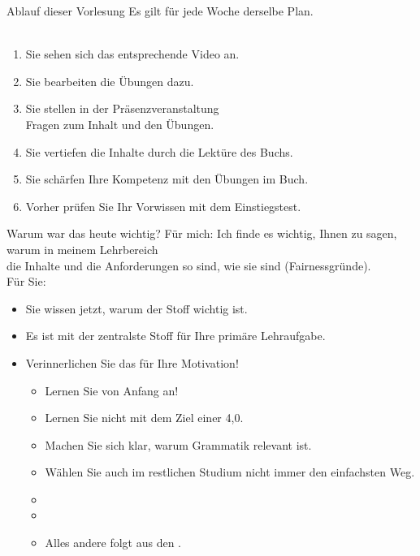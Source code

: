 \begin{frame}
  {Ablauf dieser Vorlesung}
  \onslide<+->
  \onslide<+->
  Es gilt für jede Woche derselbe Plan.\\
  \\
  \Zeile
  \begin{enumerate}[<+->]\Large
    \item Sie sehen sich das entsprechende \alert{Video} an.
    \item Sie bearbeiten die \alert{Übungen} dazu.
    \item Sie stellen in der Präsenzveranstaltung\\
      \alert{Fragen zum Inhalt und den Übungen}.
    \item Sie vertiefen die Inhalte durch die \alert{Lektüre des Buchs}.
    \item Sie schärfen Ihre Kompetenz mit den \alert{Übungen im Buch}.
      \Halbzeile
    \item[ ] Vorher prüfen Sie Ihr Vorwissen mit dem \alert{Einstiegstest}.
  \end{enumerate}
\end{frame}

\begin{frame}
  {Warum war das heute wichtig?}
  \onslide<+->
  \onslide<+->
  Für mich: Ich finde es wichtig, Ihnen zu sagen, warum in meinem Lehrbereich\\
  die Inhalte und die Anforderungen so sind, wie sie sind (\alert{Fairnessgründe}).\\
  \onslide<+->
  \Zeile
  Für Sie:\\
  \Halbzeile
  \begin{itemize}[<+->]
    \item Sie wissen jetzt, \alert{warum der Stoff wichtig ist}.
    \item Es ist mit der zentralste Stoff für Ihre primäre Lehraufgabe.
    \item \alert{Verinnerlichen Sie das für Ihre Motivation!}
      \begin{itemize}[<+->]
        \item \alert{Lernen Sie von Anfang an!}
        \item Lernen Sie nicht mit dem Ziel einer 4,0.
        \item \alert{Machen Sie sich klar, warum Grammatik relevant ist.}
        \item Wählen Sie auch im restlichen Studium nicht immer den einfachsten Weg.
          \Viertelzeile
        \item {}
          \Viertelzeile
        \item {}
        \item Alles andere folgt aus den .
      \end{itemize}
  \end{itemize}
\end{frame}


